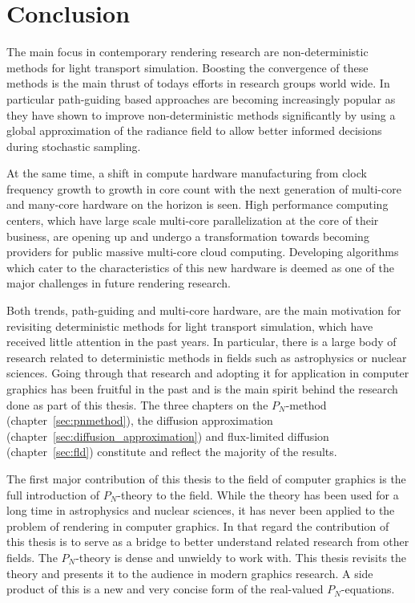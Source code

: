\chapter{Conclusion}
%
\label{sec:conclusion}

The main focus in contemporary rendering research are non-deterministic methods for light transport simulation. Boosting the convergence of these methods is the main thrust of todays efforts in research groups world wide. In particular path-guiding based approaches are becoming increasingly popular as they have shown to improve non-deterministic methods significantly by using a global approximation of the radiance field to allow better informed decisions during stochastic sampling.

At the same time, a shift in compute hardware manufacturing from clock frequency growth to growth in core count with the next generation of multi-core and many-core hardware on the horizon is seen. High performance computing centers, which have large scale multi-core parallelization at the core of their business, are opening up and undergo a transformation towards becoming providers for public massive multi-core cloud computing. Developing algorithms which cater to the characteristics of this new hardware is deemed as one of the major challenges in future rendering research.

Both trends, path-guiding and multi-core hardware, are the main motivation for revisiting deterministic methods for light transport simulation, which have received little attention in the past years. In particular, there is a large body of research related to deterministic methods in fields such as astrophysics or nuclear sciences. Going through that research and adopting it for application in computer graphics has been fruitful in the past and is the main spirit behind the research done as part of this thesis. The three chapters on the $P_N$-method (chapter~\ref{sec:pnmethod}), the diffusion approximation (chapter~\ref{sec:diffusion_approximation}) and flux-limited diffusion (chapter~\ref{sec:fld}) constitute and reflect the majority of the results.

The first major contribution of this thesis to the field of computer graphics is the full introduction of $P_N$-theory to the field. While the theory has been used for a long time in astrophysics and nuclear sciences, it has never been applied to the problem of rendering in computer graphics. In that regard the contribution of this thesis is to serve as a bridge to better understand related research from other fields. The $P_N$-theory is dense and unwieldy to work with. This thesis revisits the theory and presents it to the audience in modern graphics research. A side product of this is a new and very concise form of the real-valued $P_N$-equations.

